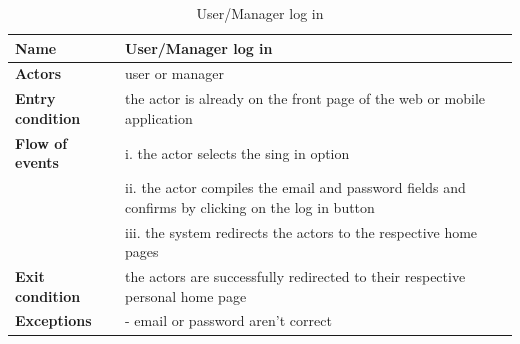 \begin{table}[h!]
    \centering
    \begin{tabular}{@{}P{0.2\textwidth}P{0.70\textwidth}@{}}
        \toprule
        \textbf{Name}                 & User/Manager log in\\
        \midrule
        \textbf{Actors}               & user or manager\\
        \textbf{Entry condition}      & the actor is already on the front page of the web or mobile application\\
        \textbf{Flow of events}            
        & i. the actor selects the sing in option\\
        & ii. the actor compiles the email and password fields and confirms by clicking on the log in button \\
        & iii. the system redirects the actors to the respective home pages\\
        \textbf{Exit condition}       & the actors are successfully redirected to their respective personal home page\\
        \textbf{Exceptions}           
        & - email or password aren’t correct \\
        \bottomrule
    \end{tabular}
\caption{User/Manager log in}
\label{table:login}
\end{table}

